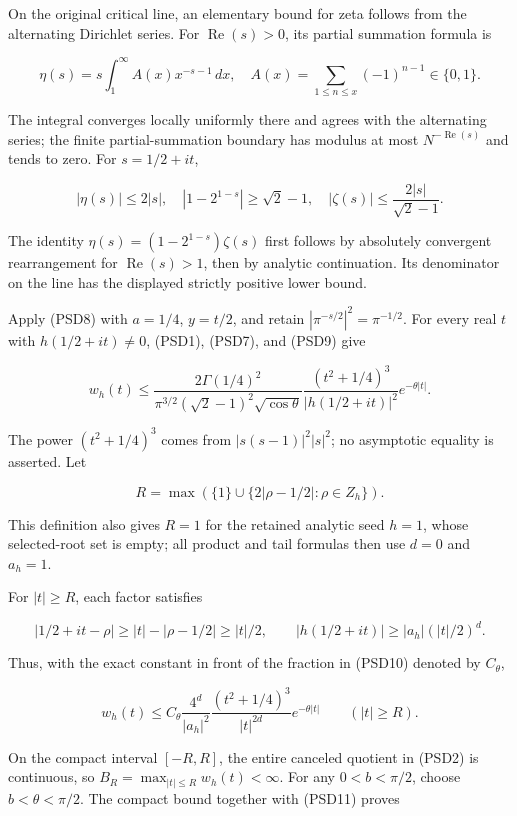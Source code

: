 On the original critical line, an elementary bound for zeta follows from the alternating Dirichlet series. For \(\operatorname{Re}(s)>0\), its partial summation formula is

\[
\eta(s)=s\int_1^\infty A(x)x^{-s-1}\,dx,
\quad A(x)=\sum_{1\le n\le x}(-1)^{n-1}\in\{0,1\}.
\]

The integral converges locally uniformly there and agrees with the alternating series; the finite partial-summation boundary has modulus at most \(N^{-\operatorname{Re}(s)}\) and tends to zero. For \(s=1/2+it\),

\[
|\eta(s)|\le2|s|,
\quad |1-2^{1-s}|\ge\sqrt2-1,
\quad |\zeta(s)|\le\frac{2|s|}{\sqrt2-1}.
\tag{PSD9}
\]

The identity \(\eta(s)=(1-2^{1-s})\zeta(s)\) first follows by absolutely convergent rearrangement for \(\operatorname{Re}(s)>1\), then by analytic continuation. Its denominator on the line has the displayed strictly positive lower bound.

Apply (PSD8) with \(a=1/4\), \(y=t/2\), and retain \(|\pi^{-s/2}|^2=\pi^{-1/2}\). For every real \(t\) with \(h(1/2+it) \ne  0\), (PSD1), (PSD7), and (PSD9) give

\[
w_h(t)\le
\frac{2\Gamma(1/4)^2}
{\pi^{3/2}(\sqrt2-1)^2\sqrt{\cos\theta}}
\frac{(t^2+1/4)^3}{|h(1/2+it)|^2}
e^{-\theta|t|}.
\tag{PSD10}
\]

The power \((t^2+1/4)^3\) comes from \(|s(s-1)|^2|s|^2\); no asymptotic equality is asserted. Let

\[
R=\max\left(\{1\}\cup\{2|\rho-1/2|:\rho\in Z_h\}\right).
\]

This definition also gives \(R=1\) for the retained analytic seed \(h=1\), whose selected-root set is empty; all product and tail formulas then use \(d=0\) and \(a_h=1\).

For \(|t|\ge R\), each factor satisfies

\[
|1/2+it-\rho|\ge |t|-|\rho-1/2|\ge |t|/2,
\qquad |h(1/2+it)|\ge |a_h|(|t|/2)^d.
\]

Thus, with the exact constant in front of the fraction in (PSD10) denoted by \(C_\theta\),

\[
w_h(t)\le
C_\theta\frac{4^d}{|a_h|^2}
\frac{(t^2+1/4)^3}{|t|^{2d}}e^{-\theta|t|}
\qquad(|t|\ge R).
\tag{PSD11}
\]

On the compact interval \([-R,R]\), the entire canceled quotient in (PSD2) is continuous, so \(B_R=\max_{|t|\le R}w_h(t)<\infty\). For any \(0<b<\pi/2\), choose \(b<\theta<\pi/2\). The compact bound together with (PSD11) proves

